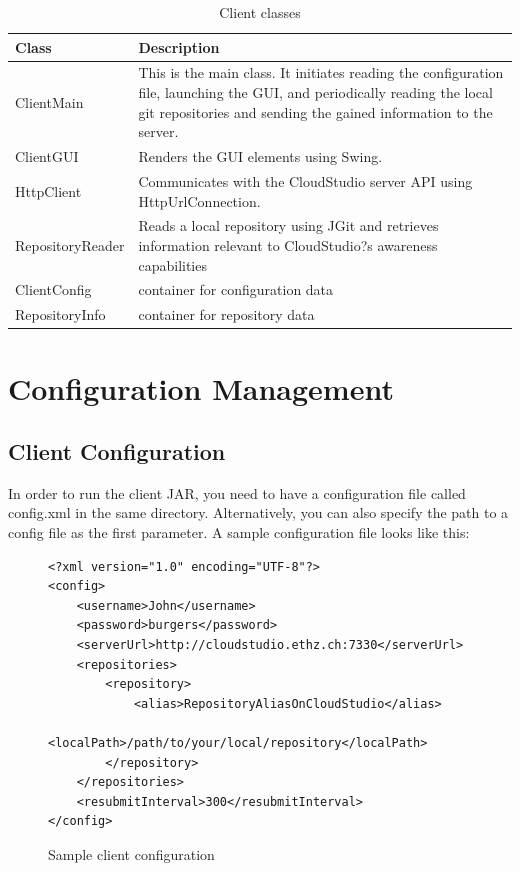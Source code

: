 \begin{table}

    \scriptsize
    \begin{tabularx}{\textwidth}{ | l | X | }
    \hline
Class & Description \\ \hline
ClientMain & This is the main class. It initiates reading the configuration file, launching the GUI, and periodically reading the local git repositories and sending the gained information to the server. \\ \hline
ClientGUI & Renders the GUI elements using Swing. \\ \hline
HttpClient & Communicates with the CloudStudio server API using HttpUrlConnection. \\ \hline
RepositoryReader & Reads a local repository using JGit and retrieves information relevant to CloudStudio?s awareness capabilities \\ \hline
ClientConfig & container for configuration data \\ \hline
RepositoryInfo & container for repository data \\ \hline
    \end{tabularx}
    
    \centering
  \caption{Client classes}
  \label{table:clientclasses}
\end{table}


\section{Configuration Management}\label{configmanagement}

\subsection{Client Configuration}

In order to run the client JAR, you need to have a configuration file called config.xml in the same directory. Alternatively, you can also specify the path to a config file as the first parameter.
A sample configuration file looks like this:

\begin{figure}[h!]
\begin{lstlisting}
<?xml version="1.0" encoding="UTF-8"?>
<config>
    <username>John</username>
    <password>burgers</password>
    <serverUrl>http://cloudstudio.ethz.ch:7330</serverUrl>
    <repositories>
        <repository>
            <alias>RepositoryAliasOnCloudStudio</alias>
            <localPath>/path/to/your/local/repository</localPath>
        </repository>
    </repositories>
    <resubmitInterval>300</resubmitInterval>
</config>
\end{lstlisting}
  \centering
  \caption{Sample client configuration}
  \label{fig:clientconfig}
\end{figure}


